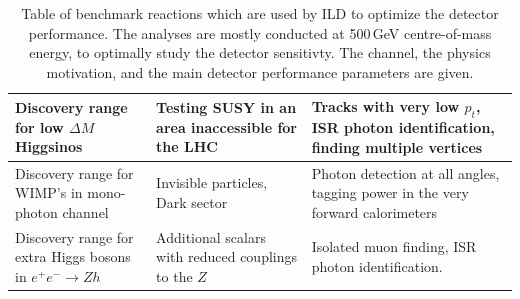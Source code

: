 \begin{table}[thb]
\begin{tabular}{ p{4cm} p{5cm} p{5cm}}
Discovery range for low $\Delta M$ Higgsinos & Testing SUSY in an area inaccessible for the LHC& Tracks with very low $p_t$, ISR photon identification, finding multiple vertices\\
\hline
Discovery range for WIMP's in mono-photon channel & Invisible particles, Dark sector & Photon detection at all angles, tagging power in the very forward calorimeters\\
\hline
Discovery range for extra Higgs bosons in $e^+e^- \rightarrow Zh$ & Additional scalars with reduced couplings to the $Z$ & Isolated muon finding, ISR photon identification.\\
\hline
\end{tabular}
    \caption{Table of benchmark reactions which are used by ILD to optimize the detector performance. The analyses are mostly conducted at 500\,GeV centre-of-mass energy, to optimally study the detector sensitivty. The channel, the physics motivation, and the main detector performance parameters are given.}
    \label{tab-benchmark}
\end{table}


